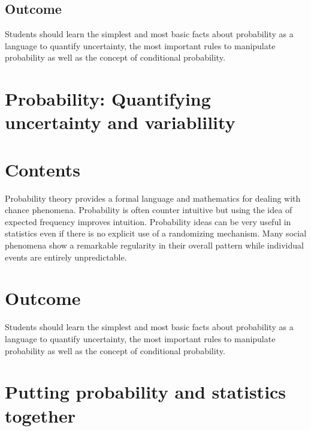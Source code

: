 \documentclass[
  letterpaper,
]{scrbook}
\begin{document}
\hypertarget{outcome-6}{%
\section{Outcome}\label{outcome-6}}

Students should learn the simplest and most basic facts about
probability as a language to quantify uncertainty, the most important
rules to manipulate probability as well as the concept of conditional
probability.


\hypertarget{probability-quantifying-uncertainty-and-variablility}{%
\chapter{Probability: Quantifying uncertainty and
variablility}\label{probability-quantifying-uncertainty-and-variablility}}


\hypertarget{contents-7}{%
\chapter{Contents}\label{contents-7}}

Probability theory provides a formal language and mathematics for
dealing with chance phenomena. Probability is often counter intuitive
but using the idea of expected frequency improves intuition. Probability
ideas can be very useful in statistics even if there is no explicit use
of a randomizing mechanism. Many social phenomena show a remarkable
regularity in their overall pattern while individual events are entirely
unpredictable.


\hypertarget{outcome-7}{%
\chapter{Outcome}\label{outcome-7}}

Students should learn the simplest and most basic facts about
probability as a language to quantify uncertainty, the most important
rules to manipulate probability as well as the concept of conditional
probability.


\hypertarget{putting-probability-and-statistics-together}{%
\chapter{Putting probability and statistics
together}\label{putting-probability-and-statistics-together}}
\end{document}
